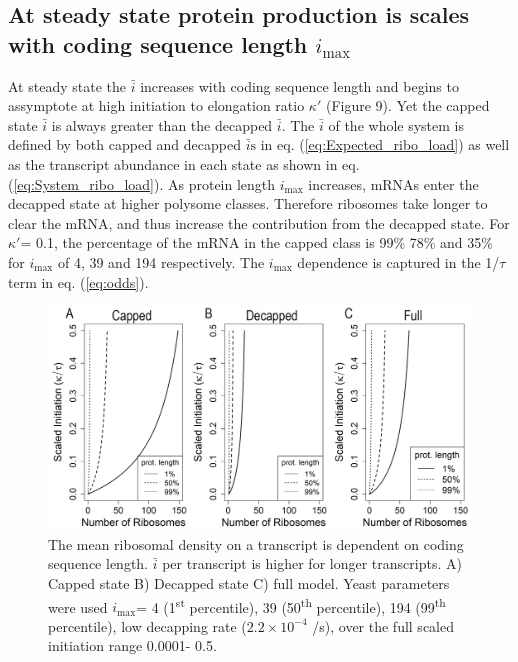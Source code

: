 \documentclass[a4,center,fleqn]{NAR}
\newcommand\rmpar[1]{\marginpar{\begin{spacing}{0.7}\raggedright \singlespacing \tiny \textbf{R:} #1 \end{spacing}}}  %
\newcommand{\imax}{\ensuremath{{i_{\max}}}\xspace}
\newcommand{\MRL}{\ensuremath{\bar{i}}\xspace}
\newcommand{\MRLs}{\ensuremath{\bar{i}\text{s}}\xspace}
\begin{document}
\subsection{At steady state protein production is scales with coding sequence length \imax}
At steady state the \MRL increases with coding sequence length and begins to assymptote at high initiation to elongation ratio $\kappa'$ (Figure 9). %
Yet the capped state \MRL is always greater than the decapped \MRL. The \MRL of the whole system is defined by both capped and decapped \MRLs in eq. (\ref{eq:Expected_ribo_load}) as well as the transcript abundance in each state as shown in eq. (\ref{eq:System_ribo_load}).
As protein length \imax increases, mRNAs enter the decapped state at higher polysome classes. 
Therefore ribosomes take longer  to clear the mRNA, and thus increase the contribution from the decapped state. 
For $\kappa'$= 0.1, the percentage of the mRNA in the capped class is  99\% 78\%  and 35\% for \imax of 4, 39 and 194 respectively.
The \imax dependence is captured in the 1/$\tau$ term in eq. (\ref{eq:odds}).
  
\begin{figure}[!ht]
\begin{center}
\includegraphics[width=120mm]{Images/MRL.png}
\caption{The mean ribosomal density on a transcript is dependent on coding sequence length. \MRL per transcript is higher for longer transcripts. A) Capped state B) Decapped state C) full model. Yeast parameters were used \imax =  4 (1\textsuperscript{st} percentile),  39 (50\textsuperscript{th} percentile), 194 (99\textsuperscript{th} percentile), low decapping rate ($2.2\times 10^{-4}$ /s), over the full scaled initiation range 0.0001- 0.5.}
\end{center}
\end{figure}
\end{document}
